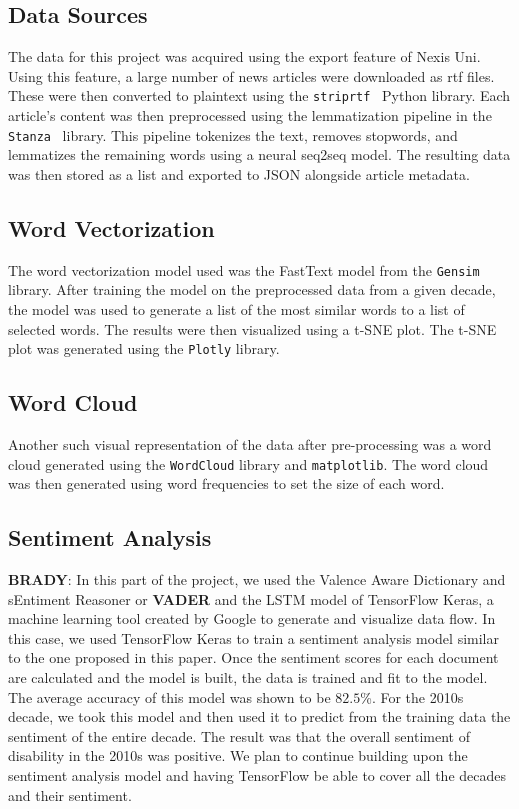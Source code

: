 \documentclass[11pt,a4paper, twocolumn]{article}
\begin{document}
\subsection{Data Sources}

The data for this project was acquired using the export feature of Nexis Uni. Using this feature, a large number of news articles were downloaded as rtf files. These were then converted to plaintext using the \texttt{striprtf}~\citep{striprtf} Python library. Each article's content was then preprocessed using the lemmatization pipeline in the \texttt{Stanza}~\citep{stanza} library. This pipeline tokenizes the text, removes stopwords, and lemmatizes the remaining words using a neural seq2seq model. The resulting data was then stored as a list and exported to JSON alongside article metadata.

\subsection{Word Vectorization}

The word vectorization model used was the FastText model from the \texttt{Gensim} library. After training the model on the preprocessed data from a given decade, the model was used to generate a list of the most similar words to a list of selected words. The results were then visualized using a t-SNE plot. The t-SNE plot was generated using the \texttt{Plotly} library.

\subsection{Word Cloud}

Another such visual representation of the data after pre-processing was a word cloud generated using the \texttt{WordCloud} library and \texttt{matplotlib}. The word cloud was then generated using word frequencies to set the size of each word.

\subsection{Sentiment Analysis}
\textbf{BRADY}: In this part of the project, we used the Valence Aware Dictionary and sEntiment Reasoner or \textbf{VADER} and the LSTM model of TensorFlow Keras, a machine learning tool created by Google to generate and visualize data flow. In this case, we used TensorFlow Keras to train a sentiment analysis model similar to the one proposed in this paper. Once the sentiment scores for each document are calculated and the model is built, the data is trained and fit to the model. The average accuracy of this model was shown to be $82.5$\%. For the 2010s decade, we took this model and then used it to predict from the training data the sentiment of the entire decade. The result was that the overall sentiment of disability in the 2010s was positive. We plan to continue building upon the sentiment analysis model and having TensorFlow be able to cover all the decades and their sentiment.
\end{document}
